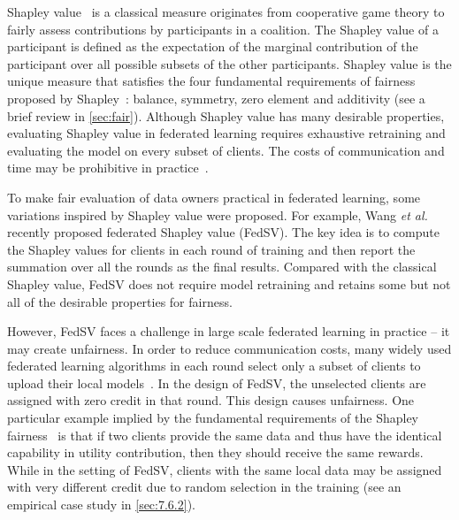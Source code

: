 
Shapley value~\cite{shapley201617} is a classical measure originates from cooperative game theory to fairly assess contributions by participants in a coalition. 
The Shapley value of a participant is defined as the expectation of the marginal contribution of the participant over all possible subsets of the other participants. Shapley value is the unique measure that satisfies the four fundamental requirements of fairness proposed by Shapley~\cite{shapley201617}: balance, symmetry, zero element and additivity (see a brief review in \autoref{sec:fair}). Although Shapley value has many desirable properties, evaluating Shapley value in federated learning requires exhaustive retraining and evaluating the model on every subset of clients. The costs of communication and time may be prohibitive in practice~\cite{song2019profit}.

To make fair evaluation of data owners practical in federated learning, some variations inspired by Shapley value were proposed. For example, Wang \textit{et al.}~\cite{wang2020principled} recently proposed federated Shapley value (FedSV). The key idea is to compute the Shapley values for clients in each round of training and then report the summation over all the rounds as the final results. Compared with the classical Shapley value, FedSV does not require model retraining and retains some but not all of the desirable properties for fairness. 

However, FedSV faces a challenge in large scale federated learning in practice -- it may create unfairness.  In order to reduce communication costs, many widely used federated learning algorithms in each round select only a subset of clients to upload their local models~\cite{mcmahan2017communication, nishio2019client}. In the design of FedSV, the unselected clients are assigned with zero credit in that round. This design causes unfairness. One particular example implied by the fundamental requirements of the Shapley fairness~\cite{shapley201617} is that if two clients provide the same data and thus have the identical capability in utility contribution, then they should receive the same rewards. While in the setting of FedSV, clients with the same local data may be assigned with very different credit due to random selection in the training (see an empirical case study in \autoref{sec:7.6.2}). 

